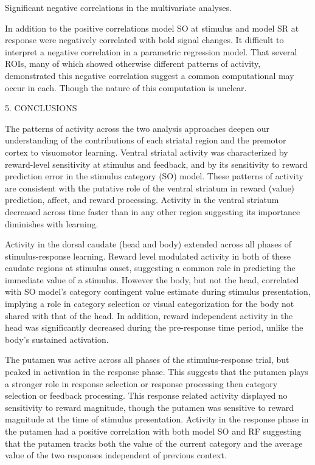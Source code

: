 Significant negative correlations in the multivariate analyses.

In addition to the positive correlations model SO at stimulus and model SR at response were negatively correlated with bold signal changes.  It difficult to interpret a negative correlation in a parametric regression model. That several ROIs, many of which showed otherwise different patterns of activity, demonstrated this negative correlation suggest a common computational may occur in each.   Though the nature of this computation is unclear. 



 

                                            5. CONCLUSIONS

  

The patterns of activity across the two analysis approaches deepen our understanding of the contributions of each striatal region and the premotor cortex to visuomotor learning. Ventral striatal activity was characterized by reward-level sensitivity at stimulus and feedback, and by its sensitivity to reward prediction error in the stimulus category (SO) model.  These patterns of activity are consistent with the putative role of the ventral striatum in reward (value) prediction, affect, and reward processing.  Activity in the ventral striatum decreased across time faster than in any other region suggesting its importance diminishes with learning.  

 Activity in the dorsal caudate (head and body) extended across all phases of stimulus-response learning.  Reward level modulated activity in both of these caudate regions at  stimulus onset, suggesting a common role in predicting the immediate value of a stimulus.  However the body, but not the head, correlated with SO model’s category contingent value estimate during stimulus presentation, implying a role in category selection or visual categorization for the body not shared with that of the head.   In addition, reward independent activity in the head was significantly decreased during the pre-response time period, unlike the body’s sustained activation.

The putamen was active across all phases of the stimulus-response trial, but peaked in activation in the response phase.  This suggests that the putamen plays a stronger role in response selection or response processing then category selection or feedback processing. This response related activity displayed no sensitivity to reward magnitude, though the putamen was sensitive to reward magnitude at the time of stimulus presentation.  Activity in the response phase in the putamen had a positive correlation with both model SO and RF suggesting that the putamen tracks both the value of the current category and the average value of the two responses independent of previous context.

